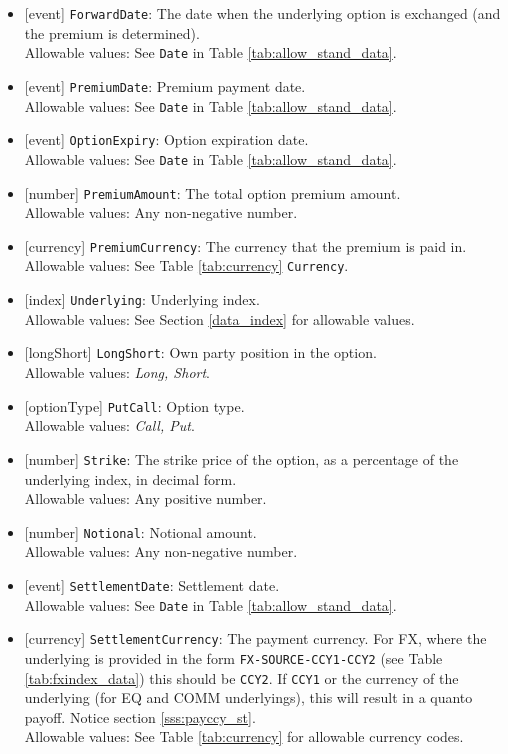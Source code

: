\begin{itemize} 
  \item{}[event] \lstinline!ForwardDate!: The date when the underlying option is exchanged (and the premium is determined). \\
  Allowable values: See \lstinline!Date! in Table \ref{tab:allow_stand_data}.
  \item{}[event] \lstinline!PremiumDate!: Premium payment date. \\
  Allowable values: See \lstinline!Date! in Table \ref{tab:allow_stand_data}.
  \item{}[event] \lstinline!OptionExpiry!: Option expiration date. \\
  Allowable values: See \lstinline!Date! in Table \ref{tab:allow_stand_data}.
  \item{}[number] \lstinline!PremiumAmount!: The total option premium amount. \\
  Allowable values: Any non-negative number.
  \item{}[currency] \lstinline!PremiumCurrency!: The currency that the premium is paid in. \\
  Allowable values: See Table \ref{tab:currency} \lstinline!Currency!.
  \item{}[index] \lstinline!Underlying!: Underlying index. \\
  Allowable values: See Section \ref{data_index} for allowable values.
  \item{}[longShort] \lstinline!LongShort!: Own party position in the option. \\
  Allowable values: \emph{Long, Short}.
  \item{}[optionType] \lstinline!PutCall!: Option type. \\
  Allowable values: \emph{Call, Put}.
  \item{}[number] \lstinline!Strike!: The strike price of the option, as a percentage of the underlying index, in decimal form. \\
  Allowable values: Any positive number.
  \item{}[number] \lstinline!Notional!: Notional amount. \\
  Allowable values: Any non-negative number.
  \item{}[event] \lstinline!SettlementDate!: Settlement date. \\
  Allowable values: See \lstinline!Date! in Table \ref{tab:allow_stand_data}.
  \item{}[currency] \lstinline!SettlementCurrency!: The payment currency. For FX, where the underlying is provided
      in the form \lstinline!FX-SOURCE-CCY1-CCY2! (see Table \ref{tab:fxindex_data}) this should
      be \lstinline!CCY2!. If \lstinline!CCY1! or the currency of the underlying (for EQ and
      COMM underlyings), this will result in a quanto payoff. Notice section \ref{sss:payccy_st}. \\
        Allowable values: See Table \ref{tab:currency} for allowable currency codes.
\end{itemize}

